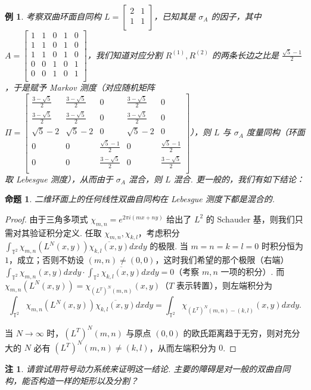 \documentclass[11pt, a4paper, oneside]{ctexart}
\newtheorem{example}[theorem]{例}
\newtheorem{proposition}[theorem]{命题}
\newtheorem{remark}[theorem]{注}
\newcommand{\T}{\mathbb{T}}
\begin{document}
    \begin{example}
        考察双曲环面自同构 $L=\begin{bmatrix}
            2&1\\
            1&1\\
        \end{bmatrix}$，已知其是 $\sigma_A$ 的因子，其中 $A=\begin{bmatrix}
            1&1&0&1&0\\
            1&1&0&1&0\\
            1&1&0&1&0\\
            0&0&1&0&1\\
            0&0&1&0&1\\
        \end{bmatrix}$，我们知道对应分割 $R^{(1)},R^{(2)}$ 的两条长边之比是 $\frac{\sqrt{5}-1}{2}$，于是赋予 Markov 测度（对应随机矩阵 $\Pi=\begin{bmatrix}
            \frac{3-\sqrt{5}}{2}&\frac{3-\sqrt{5}}{2}&0&\frac{3-\sqrt{5}}{2}&0\\
            \frac{3-\sqrt{5}}{2}&\frac{3-\sqrt{5}}{2}&0&\frac{3-\sqrt{5}}{2}&0\\
            \sqrt{5}-2&\sqrt{5}-2&0&\sqrt{5}-2&0\\
            0&0&\frac{\sqrt{5}-1}{2}&0&\frac{\sqrt{5}-1}{2}\\
            0&0&\frac{3-\sqrt{5}}{2}&0&\frac{3-\sqrt{5}}{2}\\
        \end{bmatrix}$），则 $L$ 与 $\sigma_A$ 度量同构（环面取 Lebesgue 测度），从而由于 $\sigma_A$ 混合，则 $L$ 混合. 更一般的，我们有如下结论：
    \end{example}

    \begin{proposition}
        二维环面上的任何线性双曲自同构在 Lebesgue 测度下都是混合的.
    \end{proposition}
    \begin{proof}
        由于三角多项式 $\chi_{m,n}=e^{2\pi i(mx+ny)}$ 给出了 $L^2$ 的 Schauder 基，则我们只需对其验证积分定义. 任取 $\chi_{m,n},\chi_{k,l}$，考虑积分 $\int_{\T^2}\chi_{m,n}(L^N(x,y))\overline{\chi_{k,l}(x,y)}dxdy$ 的极限. 当 $m=n=k=l=0$ 时积分恒为 $1$，成立；否则不妨设 $(m,n)\neq (0,0)$，这时我们希望的那个极限（右端）$\int_{\T^2}\chi_{m,n}(x,y)dxdy\cdot \int_{\T^2}\overline{\chi_{k,l}(x,y)}dxdy=0$（考察 $m,n$ 一项的积分）. 而 $\chi_{m,n}(L^N(x,y))=\chi_{{(L^T)}^N(m,n)}(x,y)$（$T$ 表示转置），则左端积分为
        \[
        \int_{\T^2}\chi_{m,n}(L^N(x,y))\overline{\chi_{k,l}(x,y)}dxdy=\int_{\T^2}\chi_{{(L^T)}^N(m,n)-(k,l)}(x,y)dxdy.
        \]
        
        当 $N\to\infty$ 时，${(L^T)}^N(m,n)$ 与原点 $(0,0)$ 的欧氏距离趋于无穷，则对充分大的 $N$ 必有 ${(L^T)}^N(m,n)\neq (k,l)$，从而左端积分为 $0$.
    \end{proof}
    \begin{remark}
        请尝试用符号动力系统来证明这一结论. 主要的障碍是对一般的双曲自同构，能否构造一样的矩形以及分割？
    \end{remark}
\end{document}
